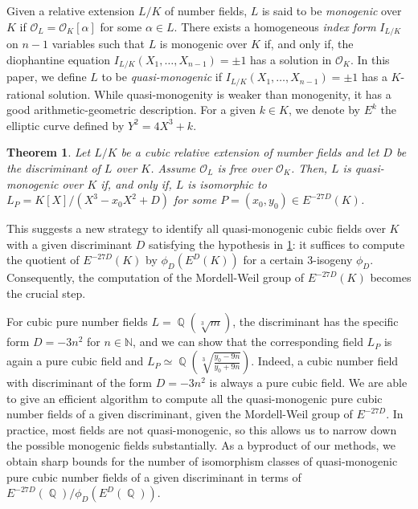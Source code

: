 \documentclass[oneside]{amsart}
\newcommand{\NN}{\mathbb{N}}
\newcommand{\embrace}[3]{\left#1 #3 \right#2}
\newcommand{\lpar}[1]{\embrace{(}{)}{#1}}
\DeclareMathOperator{\QQ}{\mathbb{Q}}
\newtheorem{theorem}[X]{Theorem}
\theoremstyle{definition}
\begin{document}
Given a relative extension $L/K$ of number fields,   $L$ is said to be \textit{monogenic} over $K$ if $\mathcal{O}_L = \mathcal{O}_K[\alpha]$ for some $\alpha \in L$. There exists a homogeneous  \textit{index form}  $I_{L/K}$ on $n - 1$ variables such that   $L$ is monogenic over $K$ if, and only if, the diophantine equation $I_{L/K}(X_1,\dots,X_{n-1}) = \pm 1$ has a solution in $\mathcal{O}_K$. In this paper, we define $L$ to be \textit{quasi-monogenic} if $I_{L/K}(X_1,\dots,X_{n-1}) = \pm 1$ has a $K$-rational solution. While quasi-monogenity is weaker than monogenity, it has a good arithmetic-geometric description. For a given $k \in K$, we denote by $E^k$ the elliptic curve defined by $Y^2 = 4X^3 + k$. 
 

\begin{theorem}
    \label{theorem: characterization of quasi-monogenity}
    Let $L/K$ be a cubic relative extension of number fields and let $D$ be the discriminant of $L$ over $K$. Assume $\mathcal{O}_L$ is free over $\mathcal{O}_K$. Then, $L$ is quasi-monogenic over $K$ if, and only if, $L$ is isomorphic to $L_P=K[X]/(X^3 - x_0X^2 + D)$ for some $P =(x_0,y_0)\in E^{-27D}(K)$.
\end{theorem}

This suggests a new strategy to identify all quasi-monogenic cubic fields over $K$ with a given discriminant $D$ satisfying the hypothesis in \ref{theorem: characterization of quasi-monogenity}: it suffices  to compute the quotient of $E^{-27D}(K)$ by $\phi_D(E^D(K))$ for a certain 3-isogeny $\phi_D$. Consequently, the computation of the Mordell-Weil group of $E^{-27D}(K)$ becomes the crucial step.

For cubic pure number fields $L=\QQ(\sqrt[3]{m})$,  the discriminant has the specific form $D=-3n^2$ for $n\in\NN$, and we can show that the corresponding field $L_P$ is again a pure cubic field and $L_P\simeq\QQ\lpar{\sqrt[3]{\frac{y_0 - 9n}{y_0 + 9n}}}$.  Indeed, a cubic number field with discriminant of  the form $D=-3n^2$ is always a pure cubic field. We are able to give an efficient algorithm to compute all the quasi-monogenic pure cubic number fields of a given discriminant, given the Mordell-Weil group of $E^{-27D}$. In practice, most fields are not quasi-monogenic, so this allows us to narrow down the possible monogenic fields substantially. As a byproduct of our methods, we obtain sharp bounds for the number of isomorphism classes of quasi-monogenic pure cubic number fields of a given discriminant in terms of $E^{-27D}(\QQ)/\phi_D(E^D(\QQ))$.
\end{document}
